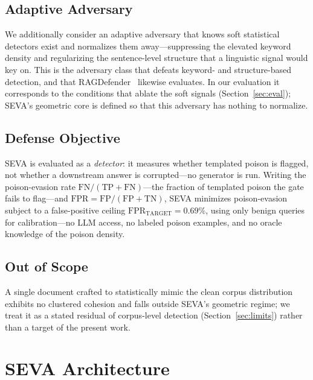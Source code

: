 \documentclass[conference]{IEEEtran}
\begin{document}
\subsection{Adaptive Adversary}
We additionally consider an adaptive adversary that knows soft statistical
detectors exist and normalizes them away---suppressing the elevated keyword
density and regularizing the sentence-level structure that a linguistic signal
would key on. This is the adversary class that defeats keyword- and
structure-based detection, and that RAGDefender~\cite{ragdefender} likewise
evaluates. In our evaluation it corresponds to the conditions that ablate the
soft signals (Section~\ref{sec:eval}); SEVA's geometric core is defined so that
this adversary has nothing to normalize.

\subsection{Defense Objective}
SEVA is evaluated as a \emph{detector}: it measures whether templated poison is
flagged, not whether a downstream answer is corrupted---no generator is run. Writing
the poison-evasion rate $\mathrm{FN}/(\mathrm{TP}+\mathrm{FN})$---the fraction of
templated poison the gate fails to flag---and
$\mathrm{FPR}=\mathrm{FP}/(\mathrm{FP}+\mathrm{TN})$, SEVA minimizes poison-evasion
subject to a false-positive ceiling
$\mathrm{FPR}_{\mathrm{TARGET}}=0.69\%$, using only benign queries for
calibration---no LLM access, no labeled poison examples, and no oracle knowledge
of the poison density.

\subsection{Out of Scope}
A single document crafted to statistically mimic the clean corpus distribution
exhibits no clustered cohesion and falls outside SEVA's geometric regime; we
treat it as a stated residual of corpus-level detection
(Section~\ref{sec:limits}) rather than a target of the present work.

\section{SEVA Architecture}
\label{sec:arch}
\end{document}
